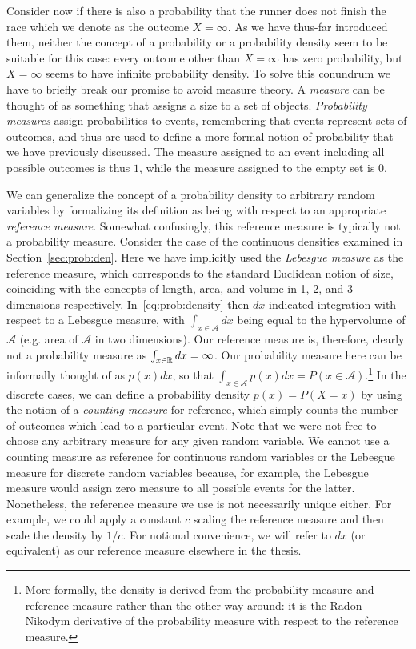 Consider now if there is also a probability that the runner does not finish the race which
we denote as the outcome $X=\infty$.  As we
have thus-far introduced them, neither the concept of a probability or a probability density
seem to be suitable for this case: every outcome other than $X=\infty$ has zero probability,
but $X=\infty$ seems to have infinite probability density.  To solve this conundrum we 
have to briefly break our promise to avoid measure theory.  A \emph{measure} can be thought of
as something that assigns a size to a set of objects.
\emph{Probability measures} assign probabilities to events, remembering that events represent 
sets of outcomes, and thus are used to define a more formal notion of probability that we have
previously discussed. 
The measure assigned to an event including all possible outcomes is thus $1$,
while the measure assigned to the empty set is $0$.  

We can generalize the concept of a probability density to arbitrary random variables
by formalizing its definition as being with respect to an appropriate \emph{reference measure}.  Somewhat confusingly,
this reference measure  is typically not a probability measure.  Consider the case of the continuous densities examined
in Section~\ref{sec:prob:den}.
Here we have implicitly used the \emph{Lebesgue measure} as the reference measure, which corresponds to
the standard Euclidean notion of size, coinciding with the concepts of length, area, and
volume in 1, 2, and 3 dimensions respectively.  In~\eqref{eq:prob:density} then $dx$ indicated 
integration with respect to a Lebesgue measure, with $\int_{x\in\mathcal{A}} dx$ being equal
to the hypervolume of $\mathcal{A}$ (e.g. area of $\mathcal{A}$ in two dimensions).  
Our reference measure is, therefore, clearly not a probability measure as $\int_{x\in\mathbb{R}} dx = \infty$.
Our probability measure here can be informally thought of as $p(x)dx$, so that  
$\int_{x\in\mathcal{A}} p(x)dx = P(x\in\mathcal{A})$.\footnote{More formally, the density is derived
	from the probability measure and reference measure rather than the other way around:
	it is the Radon-Nikodym derivative of the probability measure with respect to the reference measure.}
In the discrete cases, we can define a probability density $p(x)=P(X=x)$ by
using the notion of a \emph{counting measure} for reference, which simply counts the number of outcomes which
lead to a particular event.   Note that we were not free to choose any arbitrary measure for any given
random variable.  
We cannot use a counting measure as reference for continuous random variables
or the Lebesgue measure for discrete random variables because, for example, the Lebesgue measure would assign zero
measure to all possible events for the latter.  Nonetheless, the reference measure we use is not necessarily
unique either.  For example, we could apply a constant $c$ scaling the reference measure and
then scale the density by $1/c$.  For notional convenience, we will refer to $dx$ (or equivalent) 
as our reference measure elsewhere in the thesis.

